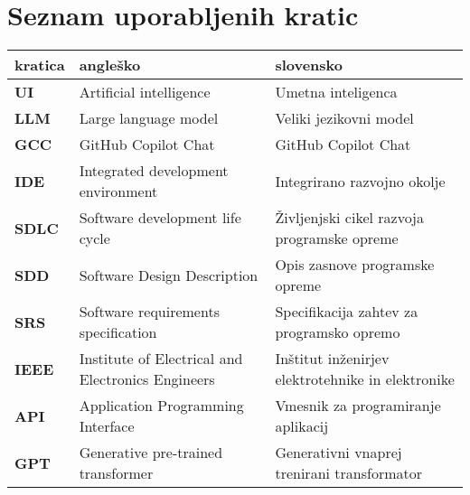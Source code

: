 \documentclass[a4paper,12pt,openright]{book}
\newcommand{\clearemptydoublepage}{\newpage{\pagestyle{empty}\cleardoublepage}}
\begin{document}
\vfill



\vspace{2cm}

\clearemptydoublepage
\pagestyle{empty}

\def\thepage{}%
\tableofcontents{}
\mainmatter 


\clearemptydoublepage


\chapter*{Seznam uporabljenih kratic}

\noindent\begin{tabular}{p{}|p{}|p{}}    %
{\bf kratica} & {\bf angleško}                              & {\bf slovensko} \\ \hline
  {\bf UI}      & Artificial intelligence               & Umetna inteligenca \\
  {\bf LLM}      & Large language model            & Veliki jezikovni model \\
  {\bf GCC}   & GitHub Copilot Chat              & GitHub Copilot Chat \\
  {\bf IDE}   & Integrated development environment              & Integrirano razvojno okolje \\
  {\bf SDLC}   & Software development life cycle              & Življenjski cikel razvoja programske opreme \\
  {\bf SDD}   & Software Design Description           & Opis zasnove programske opreme \\
  {\bf SRS}   & Software requirements specification& Specifikacija zahtev za programsko opremo \\
  {\bf IEEE}   & Institute of Electrical and Electronics Engineers& Inštitut inženirjev elektrotehnike in elektronike \\
  {\bf API}   & Application Programming Interface& Vmesnik za programiranje aplikacij \\
  {\bf GPT}   & Generative pre-trained transformer& Generativni vnaprej trenirani transformator \\

  

  

  
  



\end{tabular}
\end{document}
